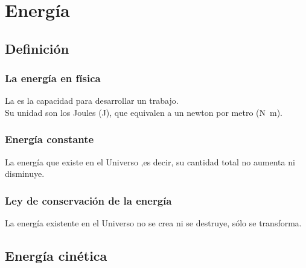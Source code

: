 \documentclass[14pt]{beamer}
\begin{document}
\section{Energía}
\subsection{Definición}

\begin{frame}
\frametitle{La energía en física}
La  es la capacidad para desarrollar un trabajo.
\\
\bigskip
\pause
Su unidad son los Joules (J), que equivalen a un newton por metro (\unit{\newton\meter}).
\end{frame}
\begin{frame}
\frametitle{Energía constante}
La energía que existe en el Universo ,\pause es decir, su cantidad total no aumenta ni disminuye.
\end{frame}
\begin{frame}
\frametitle{Ley de conservación de la energía}
La energía existente en el Universo no se crea ni se destruye, sólo se transforma.
\end{frame}

\subsection{Energía cinética}
\end{document}
